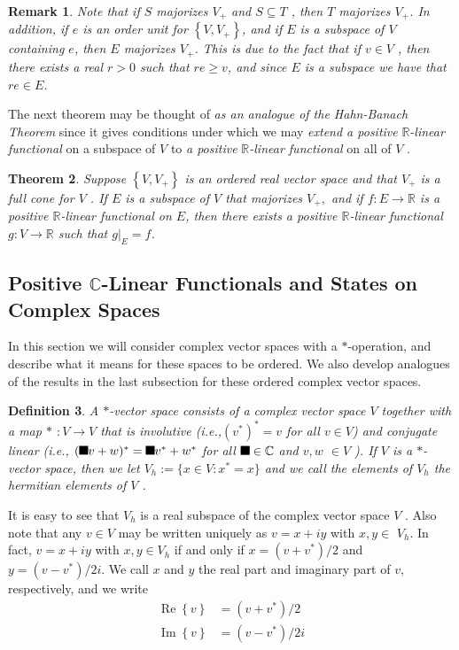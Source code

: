 \documentclass[aps,preprint]{revtex4}%
\providecommand{\U}[1]{\protect\rule{.1in}{.1in}}
\newtheorem{theorem}{Theorem}
\newtheorem{definition}[theorem]{Definition}
\newtheorem{remark}[theorem]{Remark}
\begin{document}
\begin{remark}
Note that if $S$ majorizes $V_{+}$ and $S\subseteq T$ , then $T$ majorizes
$V_{+}$. In addition, if $e$ is an order unit for $\left\{  V,V_{+}\right\}
$, and if $E$ \emph{is a subspace of} $V$ containing $e$, then $E$ majorizes
$V_{+}$. This is due to the fact that if $v\in V$ , then there exists a real
$r>0$ such that $re\geq v$, and since $E$ is a subspace we have that $re\in E$.
\end{remark}

The next theorem may be thought of \emph{as an analogue of the Hahn-Banach
Theorem} since it gives conditions under which we may \emph{extend a positive
}$\mathbb{R}$\emph{-linear functional} on a subspace of $V$ to \emph{a
positive }$\mathbb{R}$\emph{-linear functional} on all of $V$ . 

\begin{theorem}
Suppose $\left\{  V,V_{+}\right\}  $ is an ordered real vector space and that
$V_{+}$ is a full cone for $V$ . If $E$ is a subspace of $V$ that majorizes
$V_{+},$ and if $f:E\rightarrow\mathbb{R}$ is a positive $\mathbb{R}$-linear
functional on $E$, then there exists a positive $\mathbb{R}$-linear functional
$g:V\rightarrow\mathbb{R}$ such that $\left.  g\right\vert _{E}=f$.
\end{theorem}

\subsection{Positive $\mathbb{C}$-Linear Functionals and States on Complex
Spaces}

In this section we will consider complex vector spaces with a $\ast
$-operation, and describe what it means for these spaces to be ordered. We
also develop analogues of the results in the last subsection for these ordered
complex vector spaces.

\begin{definition}
A $\ast$-vector space consists of a complex vector space $V$ together with a
map $\ast$ $:V\rightarrow V$ that is involutive (i.e.,$(v^{\ast})^{\ast}=v$
for all $v\in V$) and conjugate linear (i.e., $(\U{3bb} v+w)^{\ast}=\U{3bb}
v^{\ast}+w^{\ast}$ for all $\U{3bb} \in\mathbb{C}$ and $v,w$ $\in V$ ). If $V$
is a $\ast$-vector space, then we let $V_{h}:=\{x\in V:x^{\ast}=x\}$ and we
call the elements of $V_{h}$ the hermitian elements of $V$ .
\end{definition}

It is easy to see that $V_{h}$ is a real subspace of the complex vector space
$V$ . Also note that any $v\in V$ may be written uniquely as $v=x+iy$ with
$x,y\in$ $V_{h}$. In fact, $v=x+iy$ with $x,y\in V_{h}$ if and only if
$x=(v+v^{\ast})/2$ and $y=(v-v^{\ast})/2i$. We call $x$ and $y$ the real part
and imaginary part of $v$, respectively, and we write%
\begin{align}
\operatorname{Re}\left\{  v\right\}    & =(v+v^{\ast})/2\\
\operatorname{Im}\left\{  v\right\}    & =(v-v^{\ast})/2i
\end{align}
\end{document}
